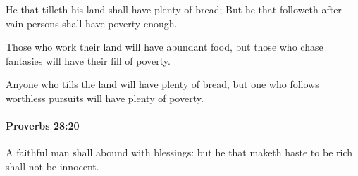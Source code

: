 			\begin{versebox}
					\item[BHS] 
					\item[ASV] He that tilleth his land shall have plenty of bread; But he that followeth after vain persons shall have poverty enough.
					\item[NIV] Those who work their land will have abundant food, but those who chase fantasies will have their fill of poverty.
					\item[NRSV] Anyone who tills the land will have plenty of bread, but one who follows worthless pursuits will have plenty of poverty.
			\end{versebox}

		\paragraph{Proverbs 28:20} %
			\label{PROVERBS-28-20}

			A faithful man shall abound with blessings: but he that maketh haste to be rich shall not be innocent.

